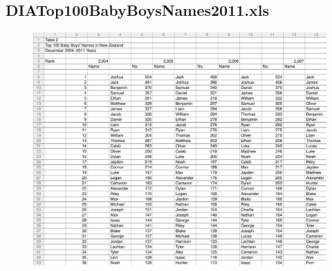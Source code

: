 \documentclass[a4paper]{article}
\begin{document}
\subsection{DIATop100BabyBoysNames2011.xls}
\label{sec:TCRO_DIATop100BabyBoysNames2011.xls}
\begin{figure}[!h]
\centering
\includegraphics[width=\textwidth]{./TestCase/DIATop100BabyBoysNames2011.pdf}
\end{figure}
\end{document}
